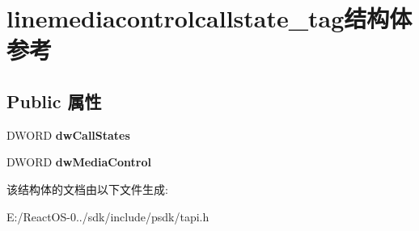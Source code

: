 \hypertarget{structlinemediacontrolcallstate__tag}{}\section{linemediacontrolcallstate\+\_\+tag结构体 参考}
\label{structlinemediacontrolcallstate__tag}
\subsection*{Public 属性}
\begin{DoxyCompactItemize}
\item 
\mbox{\label{structlinemediacontrolcallstate__tag_a0e51c811ca8ebff4598f6bbef4a8ec2a}} 
D\+W\+O\+RD {\bfseries dw\+Call\+States}
\item 
\mbox{\label{structlinemediacontrolcallstate__tag_a7cd6d077b537aed15a86635af576b46d}} 
D\+W\+O\+RD {\bfseries dw\+Media\+Control}
\end{DoxyCompactItemize}


该结构体的文档由以下文件生成\+:\begin{DoxyCompactItemize}
\item 
E\+:/\+React\+O\+S-\/0../sdk/include/psdk/tapi.\+h\end{DoxyCompactItemize}
